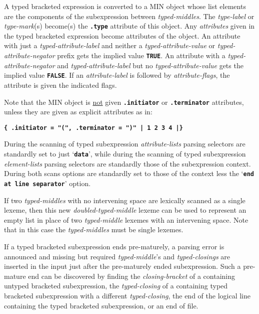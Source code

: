 \documentclass[12pt]{article}
\newcommand{\TT}[1]{{\tt \bfseries #1}}
\begin{document}
A typed bracketed expression is converted to a
MIN object whose list elements are the components of the
subexpression between {\em typed-middles}.  The
{\em type-label} or {\em type-mark}(s) become(s) the \TT{.type}
attribute of this object.  Any {\em attributes} given in the
typed bracketed expression become attributes of the object.
An attribute with just a {\em typed-attribute-label} and neither
a {\em typed-attribute-value} or {\em typed-attribute-negator} prefix
gets the implied value \TT{TRUE}.
An attribute with a {\em typed-attribute-negator}
and {\em typed-attribute-label} but no {\em typed-attribute-value}
gets the implied value \TT{FALSE}.
If an {\em attribute-label} is followed by {\em attribute-flags},
the attribute is given the indicated flags.

Note that the MIN object is \underline{not} given \TT{.initiator}
or \TT{.terminator} attributes, unless they are given as explicit
attributes as in:
\begin{center}
\TT{\{ .initiator = "(", .terminator = ")" | 1 2 3 4 |\}}
\end{center}

During the scanning of typed subexpression {\em attribute-lists}
parsing selectors are standardly set to just `\TT{data}',
while during the scanning of typed subexpression
{\em element-lists} parsing selectors are standardly
those of the subexpression context.
During both scans options are standardly set to those of the
context less the `\TT{end at line separator}' option.

If two {\em typed-middles} with no intervening space
are lexically scanned as a single lexeme, then this new
{\em doubled-typed-middle} lexeme can be used
to represent an empty list in place of
two {\em typed-middle} lexemes with an intervening space.
Note that in this case the {\em typed-middles} must be single
lexemes.

If a typed bracketed subexpression ends pre-maturely,
a parsing error is
announced and missing but required {\em typed-middle}'s and {\em typed-closings}
are inserted in the input
just after the pre-maturely ended subexpression.  Such a pre-mature end can be
discovered by finding the {\em closing-bracket} of a containing
untyped bracketed subexpression, the {\em typed-closing}
of a containing typed bracketed subexpression with a different
{\em typed-closing}, the end of the logical line
containing the typed bracketed subexpression,
or an end of file.
\end{document}
